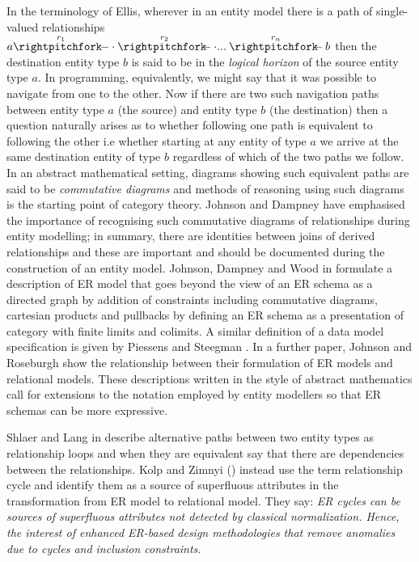 \documentclass[10pt,a4paper]{article}
\begin{document}
\noindent 
In the terminology of Ellis\cite{ellis1982}, wherever in an entity model there is a path of single-valued relationships 
$\overset{r_1}{a \rightpitchfork \hspace{-0.35em} -  \cdot} \overset{r_2}{\rightpitchfork \hspace{-0.35em} -} \cdot ... \overset{r_n}{\rightpitchfork \hspace{-0.35em} -} b$
then the destination entity type $b$ is said to be in the \textit{logical horizon}  of the source entity type $a$. In programming, equivalently, 
we might say that it was possible to navigate from one to the other. Now if there are two such navigation paths between entity type $a$ (the source) and entity type $b$ (the destination) then a question naturally arises as to whether following one path is equivalent to
following the other i.e whether starting at any entity of type $a$ we arrive at the same destination entity of type $b$ regardless of which of the two paths we follow. In an abstract mathematical setting, diagrams showing such equivalent
paths are said to be \textit{commutative diagrams} and methods of reasoning using such diagrams is the starting point of category theory. 
\noindent Johnson and Dampney \cite{Johnson93} have emphasised the 
importance of recognising such commutative diagrams of 
relationships during entity modelling; 
in summary, there are identities between joins of derived 
relationships and these are important
and should be documented during the construction of an entity model. 
Johnson, Dampney and Wood in \cite{Johnson2002ERA} formulate a description of 
ER model that goes beyond the view of an ER schema as a directed graph 
by addition of constraints including commutative diagrams, cartesian products and 
pullbacks by defining an ER schema as a presentation of category with 
finite limits and colimits.  
A similar definition of a data model specification is given by Piessens and Steegman \cite{piessens1995}.
In a further paper, Johnson and Roseburgh \cite{Johnson2002REL} show the 
relationship between their formulation of ER models and relational models. 
These descriptions written in the style of abstract mathematics call for extensions to the notation employed by entity modellers so that ER schemas can be more expressive. 

\noindent  Shlaer and Lang in \cite{Shlaer96} describe alternative paths between two entity types as relationship loops and when they are equivalent say that there are dependencies between the relationships.  
Kolp and Zimnyi (\cite{Kolp1995}) instead use the term relationship cycle and identify them as a source of 
superfluous attributes in the transformation from ER model to relational model. They say: \textit{ER cycles can be sources of 
superfluous attributes not detected by classical normalization. Hence, the interest of enhanced ER-based design methodologies
that remove anomalies due to cycles and inclusion constraints.}
\end{document}
